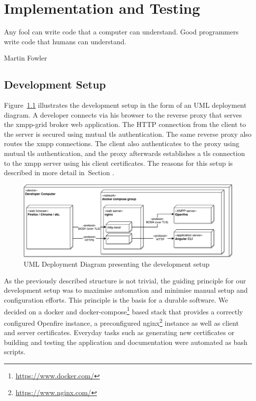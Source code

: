\chapter{Implementation and Testing} %
\epigraph{Any fool can write code that a computer can understand. Good programmers write code that humans can understand.}{Martin Fowler}


\section{Development Setup}\label{sec:development-setup}

Figure~\ref{fig:development-setup} illustrates the development setup in the form of an UML deployment diagram.
A developer connects via his browser to the reverse proxy that serves the \gls{xmpp-grid} \gls{broker} web application.
The HTTP connection from the client to the server is secured using mutual \gls{tls} authentication.
The same reverse proxy also routes the \gls{xmpp} connections.
The client also authenticates to the proxy using mutual \gls{tls} authentication, and the proxy afterwards establishes a \gls{tls} connection to the \gls{xmpp} server using his client certificates.
The reasons for this setup is described in more detail in~Section .

\begin{figure}[h]
    \centering
    \includegraphics[width=1\linewidth]{resources/development-setup-uml}
    \caption{UML Deployment Diagram presenting the development setup}
    \label{fig:development-setup}
\end{figure}

As the previously described structure is not trivial, the guiding principle for our development setup was to maximise automation and minimise manual setup and configuration efforts. This principle is the basis for a durable software.
We decided on a docker and docker-compose\footnote{\url{https://www.docker.com/}} based stack that provides a correctly configured Openfire instance, a preconfigured nginx\footnote{\url{https://www.nginx.com/}} instance as well as client and server certificates.
Everyday tasks such as generating new certificates or building and testing the application and documentation were automated as bash scripts.

